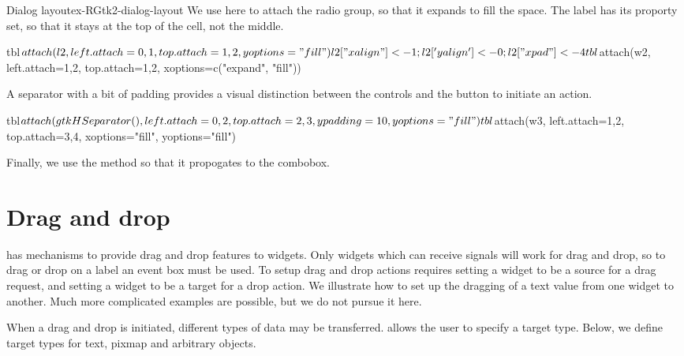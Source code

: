 \begin{example}{Dialog layout}{ex-RGtk2-dialog-layout}
We use  here to attach the radio group, so that it
expands to fill the space. The label has its  proporty
set, so that it stays at the top of the cell, not the middle.
\begin{Schunk}
\begin{Sinput}
 tbl$attach(l2, left.attach=0,1, top.attach=1,2, yoptions="fill")
 l2["xalign"] <- 1; l2['yalign'] <- 0; l2["xpad"] <- 4
 tbl$attach(w2, left.attach=1,2, top.attach=1,2, xoptions=c("expand", "fill"))
\end{Sinput}
\end{Schunk}
A separator with a bit of padding provides a visual distinction
between the controls and the button to initiate an action.
\begin{Schunk}
\begin{Sinput}
 tbl$attach(gtkHSeparator(),left.attach=0,2, top.attach=2,3, ypadding=10, yoptions="fill")
 tbl$attach(w3, left.attach=1,2, top.attach=3,4, xoptions="fill", yoptions="fill")
\end{Sinput}
\end{Schunk}
Finally, we use the  method so that it propogates to the combobox.
\begin{Schunk}
\end{Schunk}
\end{example}



\section{Drag and drop}
\label{sec:RGtk2:dnd}


\GTK\/ has mechanisms to provide drag and drop features to
widgets. Only widgets which can receive signals will work for drag and
drop, so to drag or drop on a label an event box must be used. To
setup drag and drop actions requires setting a widget to be a source
for a drag request, and setting a widget to be a target for a drop
action. We illustrate how to set up the dragging of a text value from
one widget to another. Much more complicated examples are possible,
but we do not pursue it here.

When a drag and drop is initiated, different types of data may be
transferred. \GTK\/ allows the user to specify a target type. Below,
we define target types for text, pixmap and arbitrary objects.

